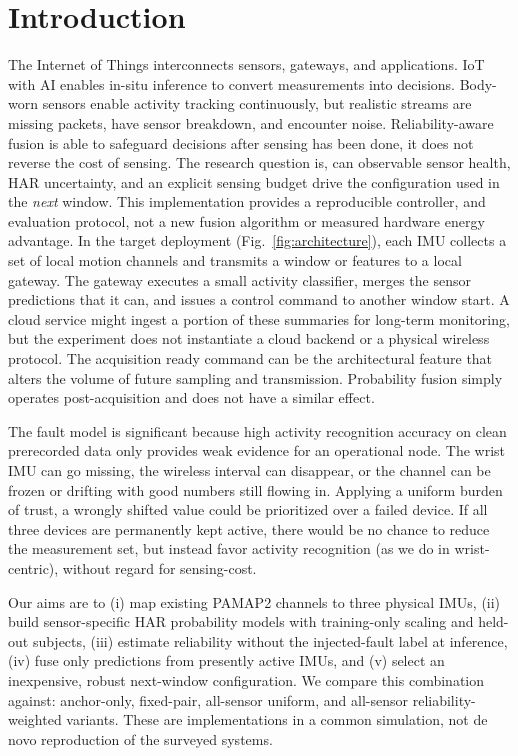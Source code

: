 \documentclass[conference]{IEEEtran}
\begin{document}
\section{Introduction}
The Internet of Things interconnects sensors, gateways, and applications. IoT with AI enables in-situ inference to convert measurements into decisions. Body-worn sensors enable activity tracking continuously, but realistic streams are missing packets, have sensor breakdown, and encounter noise. Reliability-aware fusion is able to safeguard decisions after sensing has been done, it does not reverse the cost of sensing. The research question is, can observable sensor health, HAR uncertainty, and an explicit sensing budget drive the configuration used in the \emph{next} window. This implementation provides a reproducible controller, and evaluation protocol, not a new fusion algorithm or measured hardware energy advantage.
In the target deployment 
(Fig.~\ref{fig:architecture}), each IMU collects a set of local motion channels and transmits a window or features to a local gateway. The gateway executes a small activity classifier, merges the sensor predictions that it can, and issues a control command to another window start. A cloud service might ingest a portion of these summaries for long-term monitoring, but the experiment does not instantiate a cloud backend or a physical wireless protocol. The acquisition ready command can be the architectural feature that alters the volume of future sampling and transmission. Probability fusion simply operates post-acquisition and does not have a similar effect.

The fault model is significant because high activity recognition accuracy on clean prerecorded data only provides weak evidence for an operational node. The wrist IMU can go missing, the wireless interval can disappear, or the channel can be frozen or drifting with good numbers still flowing in. Applying a uniform burden of trust, a wrongly shifted value could be prioritized over a failed device. If all three devices are permanently kept active, there would be no chance to reduce the measurement set, but instead favor activity recognition (as we do in wrist-centric), without regard for sensing-cost.

Our aims are to (i) map existing PAMAP2 channels to three physical IMUs, (ii) build sensor-specific HAR probability models with training-only scaling and held-out subjects, (iii) estimate reliability without the injected-fault label at inference, (iv) fuse only predictions from presently active IMUs, and (v) select an inexpensive, robust next-window configuration. We compare this combination against: anchor-only, fixed-pair, all-sensor uniform, and all-sensor reliability-weighted variants. These are implementations in a common simulation, not de novo reproduction of the surveyed systems.
\end{document}
